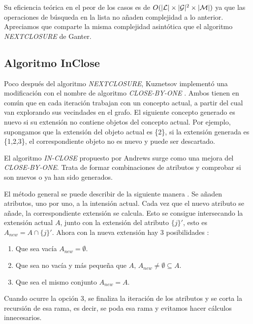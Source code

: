 \documentclass[oneside,openright,titlepage,numbers=noenddot,openany,headinclude,footinclude=true,
cleardoublepage=empty,abstractoff,BCOR=5mm,paper=a4,fontsize=12pt,main=spanish]{scrreprt}
\begin{document}
Su eficiencia teórica en el peor de los casos es de $O(|\mathcal{L}| \times |\mathcal{G}|^2 \times |\mathcal{M}|)$ \cite{lindig_concept-based_nodate} ya que las operaciones de búsqueda en la lista no añaden complejidad a lo anterior. Apreciamos que comparte la misma complejidad asintótica que el algoritmo \textit{NEXTCLOSURE} de Ganter.

\subsection{Algoritmo InClose}\label{alg:inclose}

Poco después del algoritmo \textit{NEXTCLOSURE}, Kuznetsov implementó una modificación con el nombre de algoritmo \textit{CLOSE-BY-ONE} \cite{close-by-one}. Ambos tienen en común que en cada iteración trabajan con un concepto actual, a partir del cual van explorando sus vecindades en el grafo.  El siguiente concepto generado es nuevo si su extensión no contiene objetos del concepto actual. Por ejemplo, supongamos que la extensión del objeto actual es \{2\}, si la extensión generada es \{1,2,3\}, el correspondiente objeto no es nuevo y puede ser descartado. 

El algoritmo \textit{IN-CLOSE} propuesto por Andrews \cite{inclose} surge como una mejora del \textit{CLOSE-BY-ONE}. Trata de formar combinaciones de atributos y comprobar si son nuevos o ya han sido generados.

El método general se puede describir de la siguiente manera \cite{inclose}. Se añaden atributos, uno por uno, a la intensión actual. Cada vez que el nuevo atributo se añade, la correspondiente extensión se calcula. Esto se consigue intersecando la extensión actual $A$, junto con la extensión del atributo $\{j\}'$, esto es $A_{new}=A\cap\{j\}'$. Ahora con la nueva extensión hay 3 posibilidades :

\begin{enumerate}
    \item Que sea vacía $A_{new}=\emptyset$.
    \item Que sea no vacía y más pequeña que $A$, $A_{new}\neq\emptyset \subseteq A$.
    \item Que sea el mismo conjunto $A_{new}=A$.
\end{enumerate}
 
Cuando ocurre la opción 3, se finaliza la iteración de los atributos y se corta la recursión de esa rama, es decir, se poda esa rama y evitamos hacer cálculos innecesarios. 
 
\end{document}
